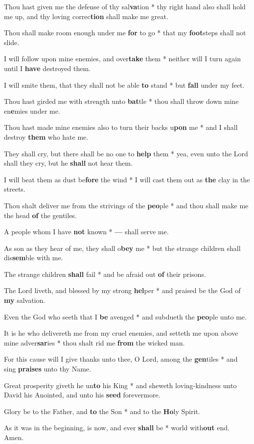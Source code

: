 \begin{multicols}{2}
	Thou hast given me the defense of thy sal\textbf{va}tion * thy right hand also shall hold me up, and thy loving correc\textbf{tion} shall make me great.
	
	Thou shall make room enough under me \textbf{for} to go * that my \textbf{foot}steps shall not slide.
	
	I will follow upon mine enemies, and over\textbf{take} them * neither will I turn again until I \textbf{have} destroyed them.
	
	I will smite them, that they shall not be able \textbf{to} stand * but \textbf{fall} under my feet.
	
	Thou hast girded me with strength unto \textbf{bat}tle * thou shall throw down mine en\textbf{e}mies under me.
	
	Thou hast made mine enemies also to turn their backs u\textbf{pon} me * and I shall destroy \textbf{them} who hate me.
	
	They shall cry, but there shall be no one to \textbf{help} them * yea, even unto the Lord shall they cry, but he \textbf{shall} not hear them.
	
	I will beat them as dust be\textbf{fore} the wind * I will cast them out as \textbf{the} clay in the streets.
	
	Thou shalt deliver me from the strivings of the \textbf{peo}ple * and thou shall make me the head \textbf{of} the gentiles.
	
	A people whom I have \textbf{not} known * \textbf{---} shall serve me.
	
	As son as they hear of me, they shall o\textbf{bey} me * but the strange children shall dis\textbf{sem}ble with me.
	
	The strange children \textbf{shall} fail * and be afraid out \textbf{of} their prisons.
	
	The Lord liveth, and blessed by my strong \textbf{hel}per * and praised be the God of \textbf{my} salvation.
	
	Even the God who seeth that I \textbf{be} avenged * and subdueth the \textbf{peo}ple unto me.
	
	It is he who delivereth me from my cruel enemies, and setteth me upon above mine adver\textbf{sar}ies * thou shalt rid me \textbf{from} the wicked man.
	
	For this cause will I give thanks unto thee, O Lord, among the \textbf{gen}tiles * and sing \textbf{praises} unto thy Name.
	
	Great prosperity giveth he un\textbf{to} his King * and sheweth loving-kindness unto David his Anointed, and unto his \textbf{seed} forevermore.
	
	Glory be to the Father, and \textbf{to} the Son * and to the \textbf{Ho}ly Spirit.
	
	As it was in the beginning, is now, and ever \textbf{shall} be * world with\textbf{out} end. Amen.
\end{multicols}